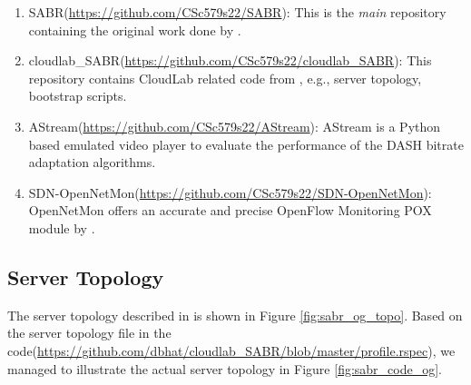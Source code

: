 \documentclass{article}
\begin{document}
\begin{enumerate}
    \item SABR(\url{https://github.com/CSc579s22/SABR}): This is the \textit{main} repository containing the original work done by \cite{bhat_network_2017}. 
    \item cloudlab\_SABR(\url{https://github.com/CSc579s22/cloudlab_SABR}): This repository contains CloudLab related code from \cite{bhat_network_2017}, e.g., server topology, bootstrap scripts. 
    \item AStream(\url{https://github.com/CSc579s22/AStream}): AStream is a Python based emulated video player to evaluate the performance of the DASH bitrate adaptation algorithms.
    \item SDN-OpenNetMon(\url{https://github.com/CSc579s22/SDN-OpenNetMon}): OpenNetMon offers an accurate and precise OpenFlow Monitoring POX module by \cite{openmon}.
\end{enumerate}

\subsection{Server Topology}

The server topology described in \cite{bhat_network_2017} is shown in Figure \ref{fig:sabr_og_topo}. Based on the server topology file in the code(\url{https://github.com/dbhat/cloudlab_SABR/blob/master/profile.rspec}), we managed to illustrate the actual server topology in Figure \ref{fig:sabr_code_og}.
\end{document}

